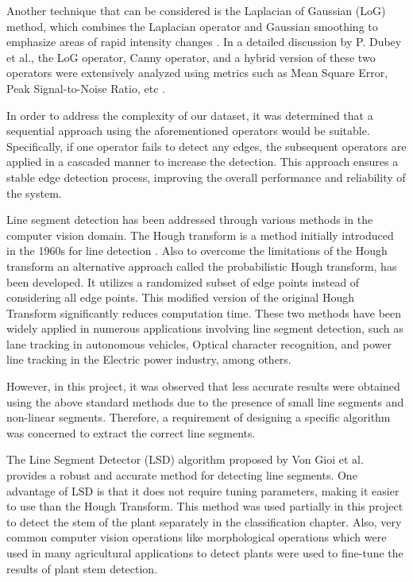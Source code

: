 \documentclass[]{iat}
\begin{document}
\par
Another technique that can be considered is the Laplacian of Gaussian (LoG) method, which combines the Laplacian operator and Gaussian smoothing to emphasize areas of rapid intensity changes \cite{canny1980}. In a detailed discussion by P. Dubey et al., the LoG operator, Canny operator, and a hybrid version of these two operators were extensively analyzed using metrics such as Mean Square Error, Peak Signal-to-Noise Ratio, etc \cite{9170672}. 
\par
In order to address the complexity of our dataset, it was determined that a sequential approach using the aforementioned operators would be suitable. Specifically, if one operator fails to detect any edges, the subsequent operators are applied in a cascaded manner to increase the detection. This approach ensures a stable edge detection process, improving the overall performance and reliability of the system.
\par
Line segment detection has been addressed through various methods in the computer vision domain. The Hough transform is a method initially introduced in the 1960s for line detection \cite{Hough_1962_2186}. Also to overcome the limitations of the Hough transform an alternative approach called the probabilistic Hough transform, has been developed. It utilizes a randomized subset of edge points instead of considering all edge points\cite{Matas2000}. This modified version of the original Hough Transform significantly reduces computation time. These two methods have been widely applied in numerous applications involving line segment detection, such as lane tracking in autonomous vehicles\cite{10025098}, Optical character recognition\cite{243184}, and power line tracking in the Electric power industry\cite{10060117}, among others. 
\par
However, in this project, it was observed that less accurate results were obtained using the above standard methods due to the presence of small line segments and non-linear segments. Therefore, a requirement of designing a specific algorithm was concerned to extract the correct line segments.
\par
The Line Segment Detector (LSD) algorithm proposed by Von Gioi et al. provides a robust and accurate method for detecting line segments\cite{ipol.2012.gjmr-lsd}. One advantage of LSD is that it does not require tuning parameters, making it easier to use than the Hough Transform. This method was used partially in this project to detect the stem of the plant separately in the classification chapter. Also, very common computer vision operations like morphological operations which were used in many agricultural applications to detect plants\cite{7418873, 10051285} were used to fine-tune the results of plant stem detection. 
\end{document}

